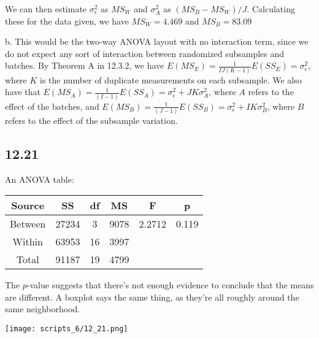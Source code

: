 \documentclass{article}
\newcommand{\ep}{\epsilon}
\begin{document}
We can then estimate $\sigma_\ep^2$ as $MS_W$ and $\sigma_A^2$ as $(MS_B-MS_W)/J$. Calculating these for the data given, we have $MS_W=4.469$ and $MS_B=83.09$

\noindent b. This would be the two-way ANOVA layout with no interaction term, since we do not expect any sort of interaction between randomized subsamples and batches. By Theorem A in 12.3.2, we have $E(MS_E)=\frac{1}{IJ(K-1)}E(SS_E)=\sigma_\ep^2$, where $K$ is the number of duplicate measurements on each subsample. We also have that $E(MS_A)=\frac{1}{(I-1)}E(SS_A)=\sigma_\ep^2+JK\sigma_A^2$, where $A$ refers to the effect of the batches, and $E(MS_B)=\frac{1}{(J-1)}E(SS_B)=\sigma_\ep^2+IK\sigma_B^2$, where $B$ refers to the effect of the subsample variation.
\subsection*{12.21}
An ANOVA table:

\begin{tabular}{cccccc}
\hline
Source & SS & df & MS & F & p\\
\hline
Between & 27234 & 3 & 9078 & 2.2712 & 0.119\\
Within & 63953 & 16 & 3997 \\
Total & 91187 & 19 & 4799\\
\end{tabular}

The $p$-value suggests that there's not enough evidence to conclude that the means are different. A boxplot says the same thing, as they're all roughly around the same neighborhood.

\texttt{[image: scripts\_6/12\_21.png]}
\end{document}
